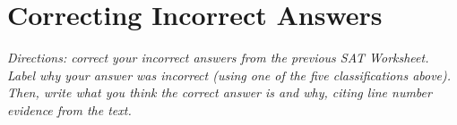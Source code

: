 \section{Correcting Incorrect Answers}

\textit{Directions: correct your incorrect answers from the previous SAT Worksheet. Label why your answer
was incorrect (using one of the five classifications above). Then, write what you think the correct
answer is and why, citing line number evidence from the text.}